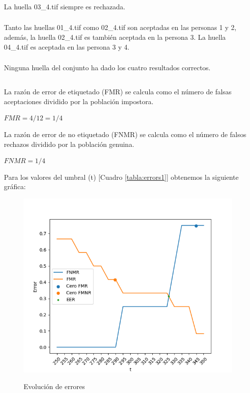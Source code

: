 \documentclass[10pt,a4paper]{article}
\begin{document}
\subsubsection{}
La huella 03\_4.tif siempre es rechazada.
\subsubsection{}
Tanto las huellas 01\_4.tif como 02\_4.tif son aceptadas en las personas 1 y 2, además, la huella 02\_4.tif es también aceptada en la persona 3. La huella 04\_4.tif es aceptada en las persona 3 y 4.

\subsubsection{}
Ninguna huella del conjunto ha dado los cuatro resultados correctos.


\subsection{}
La razón de error de etiquetado (FMR) se calcula como el número de falsas aceptaciones dividido por la población impostora.

\begin{center}
$FMR = 4/12 = 1/4$

\end{center}
La razón de error de no etiquetado (FNMR) se calcula como el número de falsos
rechazos dividido por la población genuina.

\begin{center}
$FNMR = 1/4$
\end{center}

Para los valores del umbral (t) [Cuadro \ref{tabla:errors1}] obtenemos la siguiente gráfica:

\begin{figure}[h!]
  \centering
  \includegraphics[scale=0.7]{errorsv1.png}\\
  \caption{Evolución de errores}
  \label{fig:errors2}
\end{figure}
\end{document}
